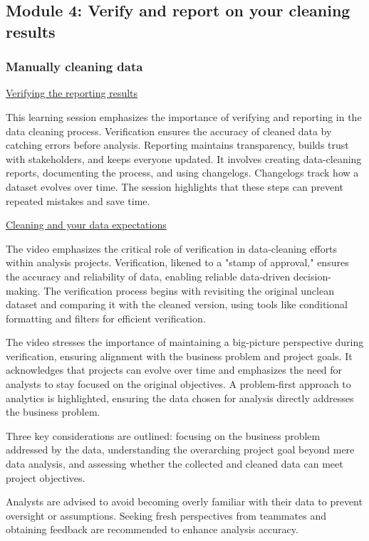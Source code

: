 \documentclass[]{article}
\begin{document}
\pagebreak

\subsection{Module 4: Verify and report on your cleaning results}

\subsubsection{Manually cleaning data}

\uline{Verifying the reporting results}

This learning session emphasizes the importance of verifying and reporting in the data cleaning process. Verification ensures the accuracy of cleaned data by catching errors before analysis. Reporting maintains transparency, builds trust with stakeholders, and keeps everyone updated. It involves creating data-cleaning reports, documenting the process, and using changelogs. Changelogs track how a dataset evolves over time. The session highlights that these steps can prevent repeated mistakes and save time.

\uline{Cleaning and your data expectations}

The video emphasizes the critical role of verification in data-cleaning efforts within analysis projects. Verification, likened to a "stamp of approval," ensures the accuracy and reliability of data, enabling reliable data-driven decision-making. The verification process begins with revisiting the original unclean dataset and comparing it with the cleaned version, using tools like conditional formatting and filters for efficient verification.

The video stresses the importance of maintaining a big-picture perspective during verification, ensuring alignment with the business problem and project goals. It acknowledges that projects can evolve over time and emphasizes the need for analysts to stay focused on the original objectives. A problem-first approach to analytics is highlighted, ensuring the data chosen for analysis directly addresses the business problem.

Three key considerations are outlined: focusing on the business problem addressed by the data, understanding the overarching project goal beyond mere data analysis, and assessing whether the collected and cleaned data can meet project objectives.

Analysts are advised to avoid becoming overly familiar with their data to prevent oversight or assumptions. Seeking fresh perspectives from teammates and obtaining feedback are recommended to enhance analysis accuracy.
\end{document}
